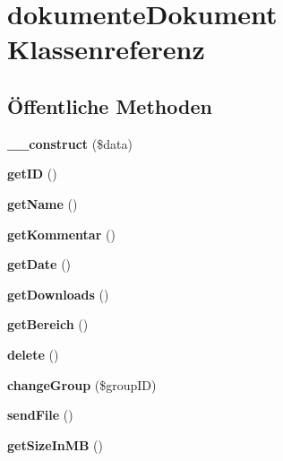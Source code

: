 \hypertarget{classdokumente_dokument}{}\section{dokumente\+Dokument Klassenreferenz}
\label{classdokumente_dokument}
\subsection*{Öffentliche Methoden}
\begin{DoxyCompactItemize}
\item 
\mbox{\label{classdokumente_dokument_a896117031502d3005070194d5ce27680}} 
{\bfseries \+\_\+\+\_\+construct} (\$data)
\item 
\mbox{\label{classdokumente_dokument_a3fe7e9dc18d396665dacbde176125790}} 
{\bfseries get\+ID} ()
\item 
\mbox{\label{classdokumente_dokument_a3598db4553e37c64bbec1aaf848defe8}} 
{\bfseries get\+Name} ()
\item 
\mbox{\label{classdokumente_dokument_a338667fd46dd8ff7ef332bc9e6f3ca55}} 
{\bfseries get\+Kommentar} ()
\item 
\mbox{\label{classdokumente_dokument_abbc715afa14fbf39036e320b1ca00b2d}} 
{\bfseries get\+Date} ()
\item 
\mbox{\label{classdokumente_dokument_a57cc61e695f79e9debae6fd1104594a3}} 
{\bfseries get\+Downloads} ()
\item 
\mbox{\label{classdokumente_dokument_a6402860965a38eeeb8c1461c255da1a8}} 
{\bfseries get\+Bereich} ()
\item 
\mbox{\label{classdokumente_dokument_a9c62a1ac98da03465a1b5eeef09e3290}} 
{\bfseries delete} ()
\item 
\mbox{\label{classdokumente_dokument_a77f5c39cce9204eea2a5fe8f7332700d}} 
{\bfseries change\+Group} (\$group\+ID)
\item 
\mbox{\label{classdokumente_dokument_a149a2bec6bd7d0265a5f4a811ef02e16}} 
{\bfseries send\+File} ()
\item 
\mbox{\label{classdokumente_dokument_a932a9bf7bfb610d29ea882c6b17020d0}} 
{\bfseries get\+Size\+In\+MB} ()
\end{DoxyCompactItemize}
